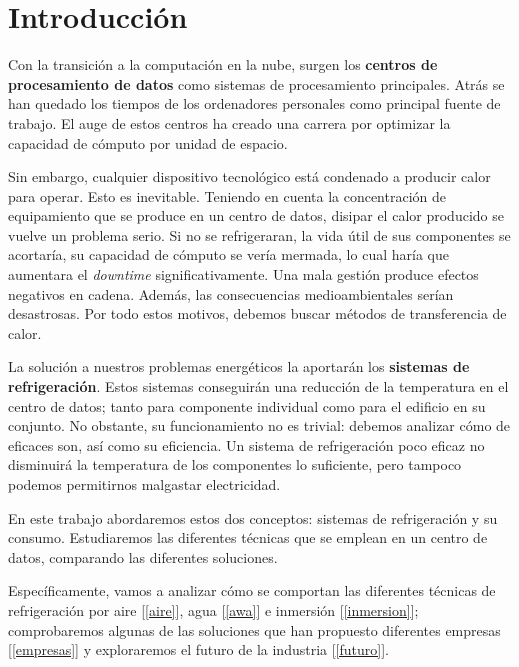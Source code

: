 
\newpage

\chapter{Introducción}

Con la transición a la computación en la nube, surgen los \textbf{centros de procesamiento de datos} como sistemas de procesamiento principales. Atrás se han quedado los tiempos de los ordenadores personales como principal fuente de trabajo. El auge de estos centros ha creado una carrera por optimizar la capacidad de cómputo por unidad de espacio.

Sin embargo, cualquier dispositivo tecnológico está condenado a producir calor para operar. Esto es inevitable. Teniendo en cuenta la concentración de equipamiento que se produce en un centro de datos, disipar el calor producido se vuelve un problema serio. Si no se refrigeraran, la vida útil de sus componentes se acortaría, su capacidad de cómputo se vería mermada, lo cual haría que aumentara el \textit{downtime} significativamente. Una mala gestión produce efectos negativos en cadena. Además, las consecuencias medioambientales serían desastrosas. Por todo estos motivos, debemos buscar métodos de transferencia de calor.

La solución a nuestros problemas energéticos la aportarán los \textbf{sistemas de refrigeración}. Estos sistemas conseguirán una reducción de la temperatura en el centro de datos; tanto para componente individual como para el edificio en su conjunto. No obstante, su funcionamiento no es trivial: debemos analizar cómo de eficaces son, así como su eficiencia. Un sistema de refrigeración poco eficaz no disminuirá la temperatura de los componentes lo suficiente, pero tampoco podemos permitirnos malgastar electricidad.

En este trabajo abordaremos estos dos conceptos: sistemas de refrigeración y su consumo. Estudiaremos las diferentes técnicas que se emplean en un centro de datos, comparando las diferentes soluciones.

Específicamente, vamos a analizar cómo se comportan las diferentes técnicas de refrigeración por aire [\ref{aire}], agua [\ref{awa}] e inmersión [\ref{inmersion}]; comprobaremos algunas de las soluciones que han propuesto diferentes empresas [\ref{empresas}] y exploraremos el futuro de la industria [\ref{futuro}].


\newpage

